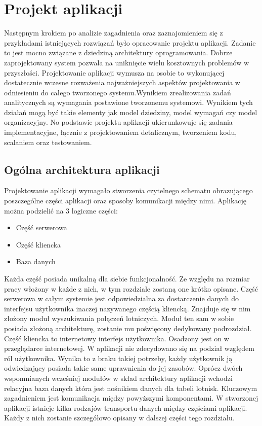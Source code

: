 \documentclass[12pt, twoside]{report}
\begin{document}
\chapter{Projekt aplikacji}
Następnym krokiem po analizie zagadnienia oraz zaznajomieniem się z przykładami istniejących rozwiązań było opracowanie projektu aplikacji. Zadanie to jest mocno związane z dziedziną architektury oprogramowania. Dobrze zaprojektowany system pozwala na uniknięcie wielu kosztownych problemów w przyszłości. Projektowanie aplikacji wymusza na osobie to wykonującej dostatecznie wczesne rozważenia najważniejszych aspektów projektowania w odniesieniu do całego tworzonego systemu.\cite{architektura}Wynikiem zrealizowania zadań analitycznych są wymagania postawione tworzonemu systemowi. Wynikiem tych działań mogą być takie elementy jak model dziedziny, model wymagań czy model organizacyjny. No podstawie projektu aplikacji ukierunkowuje się zadania implementacyjne, łącznie z projektowaniem detalicznym, tworzeniem kodu, scalaniem oraz testowaniem.


\section{Ogólna architektura aplikacji}
Projektowanie aplikacji wymagało stworzenia czytelnego schematu obrazującego poszczególne części aplikacji oraz sposoby komunikacji między nimi.
Aplikację można podzielić na 3 logiczne części: 
\begin{itemize}[noitemsep,topsep=0pt]
\item Część serwerowa
\item Część kliencka
\item Baza danych 
\end{itemize}
Każda część posiada unikalną dla siebie funkcjonalność. 
Ze względu na rozmiar pracy włożony w każde z nich, w tym rozdziale zostaną one krótko opisane.
Część serwerowa w całym systemie jest odpowiedzialna za dostarczenie danych do interfejsu użytkownika inaczej nazywanego częścią kliencką. Znajduje się w nim złożony moduł wyszukiwania połączeń lotniczych. Moduł ten sam w sobie posiada złożoną architekturę, zostanie mu poświęcony dedykowany podrozdział.
Część kliencka to internetowy interfejs użytkownika. Osadzony jest on w przeglądarce internetowej. W aplikacji nie zdecydowano się na podział względem ról użytkownika. Wynika to z braku takiej potrzeby, każdy użytkownik ją odwiedzający posiada takie same uprawnienia do jej zasobów.
Oprócz dwóch wspomnianych wcześniej modułów w skład architektury aplikacji wchodzi relacyjna baza danych która jest nośnikiem danych dla tabeli lotnisk.
Kluczowym zagadnieniem jest komunikacja między powyższymi komponentami. W stworzonej aplikacji istnieje kilka rodzajów transportu danych między częściami aplikacji. Każdy z nich zostanie szczegółowo opisany w dalszej części tego rozdziału.
\end{document}
